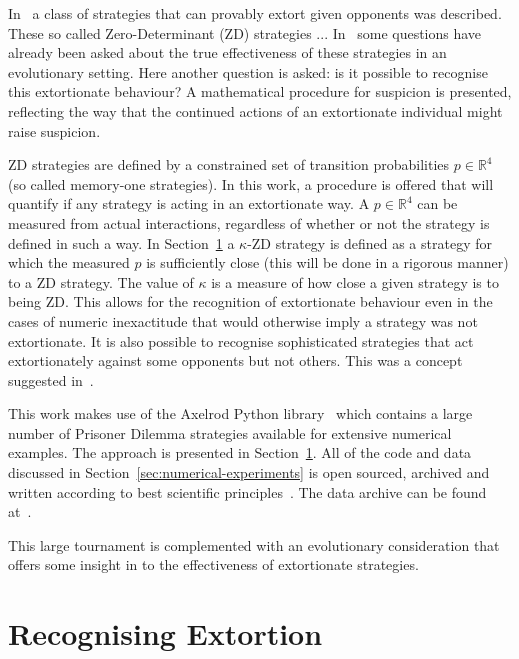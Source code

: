 \documentclass[a4paper]{article}
\begin{document}
In~\cite{Press2012} a class of strategies that can provably extort given
opponents was described.
These so called Zero-Determinant (ZD) strategies ...
In~\cite{Hilbe2013, Moran1707} some questions have
already been asked about the true effectiveness of these strategies in an
evolutionary setting. Here another question is asked: is it possible to
recognise this extortionate behaviour? A mathematical procedure for suspicion is
presented, reflecting the way that the continued actions of an extortionate
individual might raise suspicion.

ZD strategies are defined by a constrained set of transition probabilities
\(p\in\mathbb{R}^4\) (so called memory-one strategies). In this work, a
procedure is offered that will quantify if any strategy is acting in an
extortionate way. A \(p\in\mathbb{R}^4\) can be measured from actual
interactions, regardless of whether or not the strategy is defined in such a
way. In Section~\ref{sec:kappa-zd-strategies} a \(\kappa\)-ZD strategy is
defined as a strategy for which the measured \(p\) is sufficiently close (this
will be done in a rigorous manner) to a ZD strategy. The value of \(\kappa\) is
a measure of how close a given strategy is to being ZD. This allows for the
recognition of extortionate behaviour even in the cases of numeric inexactitude
that would otherwise imply a strategy was not extortionate. It is also possible
to recognise sophisticated strategies that act extortionately against some
opponents but not others. This was a concept suggested in~\cite{}. %

This work makes use of the Axelrod Python library~\cite{Knight2016, Knight2018}
which contains a large number of Prisoner Dilemma strategies available for
extensive numerical examples.  The approach is presented
in Section~\ref{sec:kappa-zd-strategies}.  All of the code and data discussed
in Section~\ref{sec:numerical-experiments} is open sourced, archived and
written according to best scientific principles~\cite{Wilson2014}. The data
archive can be found at~\cite{vincent_knight_2018_1297075}.

This large tournament is complemented with an evolutionary consideration that
offers some insight in to the effectiveness of extortionate strategies.

\section{Recognising Extortion}\label{sec:kappa-zd-strategies}
\end{document}
